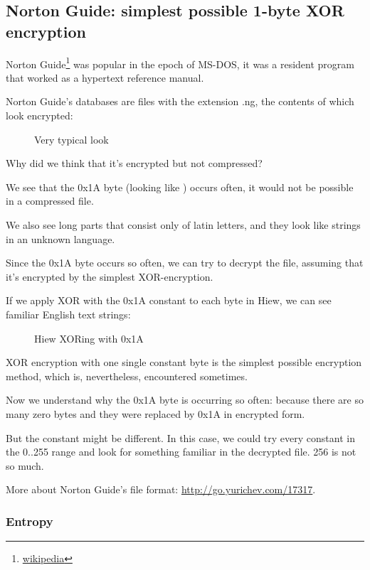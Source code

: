 \clearpage
\subsection{Norton Guide: simplest possible 1-byte XOR encryption}
\label{norton_guide}

Norton Guide\footnote{\href{http://go.yurichev.com/17116}{wikipedia}} was popular in the epoch of MS-DOS, it was a resident program that worked as a hypertext reference manual.

Norton Guide's databases are files with the extension .ng, the contents of which look encrypted:

\begin{figure}[H]
\centering
{}
\caption{Very typical look}
\end{figure}

Why did we think that it's encrypted but not compressed?

We see that the 0x1A byte (looking like \q{$\rightarrow$}) occurs often, it would not be possible in a compressed file.

We also see long parts that consist only of latin letters, and they look like strings in an unknown
language.

\clearpage
Since the 0x1A byte occurs so often, we can try to decrypt the file, assuming that it's encrypted
by the simplest XOR-encryption.

If we apply XOR with the 0x1A constant to each byte in Hiew, we can see familiar English text strings:

\begin{figure}[H]
\centering
{}
\caption{Hiew XORing with 0x1A}
\end{figure}

XOR encryption with one single constant byte is the simplest possible encryption method, which is, nevertheless,
encountered sometimes.

Now we understand why the 0x1A byte is occurring so often: because there are so many zero bytes and they
were replaced by 0x1A in encrypted form.

But the constant might be different.
In this case, we could try every constant in the 0..255 range and look for something familiar in the decrypted
file. 256 is not so much.

More about Norton Guide's file format: \url{http://go.yurichev.com/17317}.

\subsubsection{Entropy}

